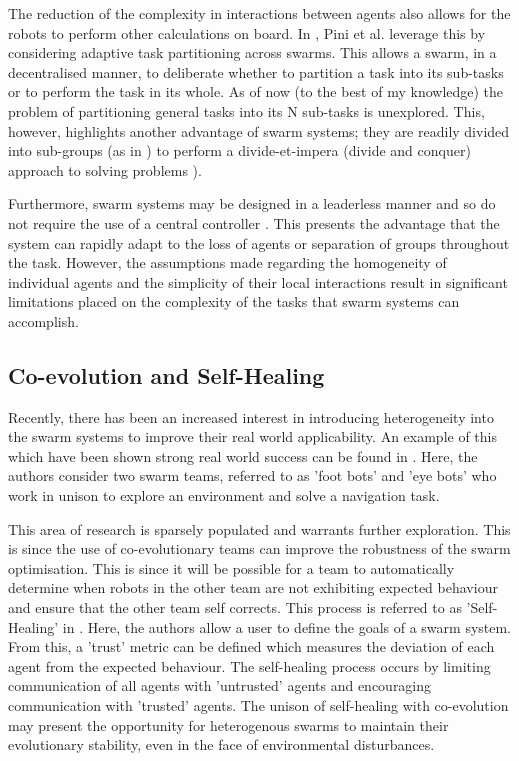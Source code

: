\documentclass[preprint,8pt]{report}
\begin{document}
The reduction of the complexity in interactions between agents also allows for the robots to perform other calculations on board. In \cite{Pini2011TaskSelection}, Pini et al. leverage this by considering adaptive task partitioning across swarms. This allows a swarm, in a decentralised manner, to deliberate whether to partition a task into its sub-tasks or to perform the task in its whole. As of now (to the best of my knowledge) the problem of partitioning general tasks into its N sub-tasks is unexplored. This, however, highlights another advantage of swarm systems; they are readily divided into sub-groups (as in \cite{Zahadat2016DivisionInhibition}) to perform a divide-et-impera (divide and conquer) approach to solving problems \cite{Pini2011TaskSelection}). 

Furthermore, swarm systems may be designed in a leaderless manner and so do not require the use of a central controller \cite{Couceiro2015}. This presents the advantage that the system can rapidly adapt to the loss of agents or separation of groups throughout the task. However, the assumptions made regarding the homogeneity of individual agents and the simplicity of their local interactions result in significant limitations placed on the complexity of the tasks that swarm systems can accomplish. 

\subsection{Co-evolution and Self-Healing}

Recently, there has been an increased interest in introducing heterogeneity into the swarm systems to improve their real world applicability. An example of this which have been shown strong real world success can be found in \cite{DucatelleSelf-organizedSwarms}. Here, the authors consider two swarm teams, referred to as 'foot bots' and 'eye bots' who work in unison to explore an environment and solve a navigation task. 

This area of research is sparsely populated and warrants further exploration. This is since the use of co-evolutionary teams can improve the robustness of the swarm optimisation. This is since it will be possible for a team to automatically determine when robots in the other team are not exhibiting expected behaviour and ensure that the other team self corrects. This process is referred to as 'Self-Healing' in \cite{LiuTrust-Aware}. Here, the authors allow a user to define the goals of a swarm system. From this, a 'trust' metric can be defined which measures the deviation of each agent from the expected behaviour. The self-healing process occurs by limiting communication of all agents with 'untrusted' agents and encouraging communication with 'trusted' agents. The unison of self-healing with co-evolution may present the opportunity for heterogenous swarms to maintain their evolutionary stability, even in the face of environmental disturbances.
\end{document}

